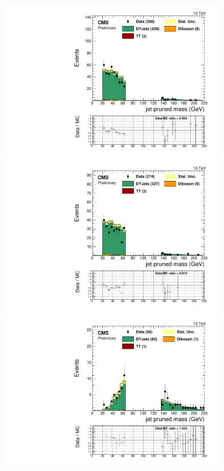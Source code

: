 \begin{figure}[h]
\begin{center}
\includegraphics[scale=0.37]{figures/control/massZjjMLP.pdf}
\includegraphics[scale=0.37]{figures/control/massZjjELP.pdf}\\[2cm]
\includegraphics[scale=0.37]{figures/control/massZjjMHP.pdf}

\end{center}
\end{figure}
